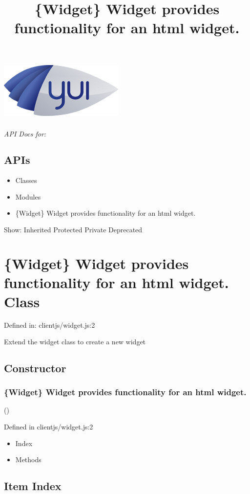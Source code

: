 \documentclass[10pt]{article}
\title{\{Widget\} Widget provides functionality for an html widget.}
\begin{document}
\section*{\includegraphics[scale=1]{../assets/css/logo.png} }
\emph{API Docs for: }
\subsection*{APIs}
\begin{itemize}
\item Classes
\item Modules

\end{itemize}
\begin{itemize}
\item \{Widget\} Widget provides functionality for an html widget.

\end{itemize}
\begin{itemize}

\end{itemize}
 Show:  Inherited  Protected  Private  Deprecated \section*{\{Widget\} Widget provides functionality for an html widget. Class}
 Defined in: clientjs/widget.js:2

 Extend the widget class to create a new widget
\subsection*{Constructor}
\subsubsection*{\{Widget\} Widget provides functionality for an html widget.}
()

  Defined in clientjs/widget.js:2
\begin{itemize}
\item Index
\item Methods

\end{itemize}
\subsection*{Item Index}
\end{document}
